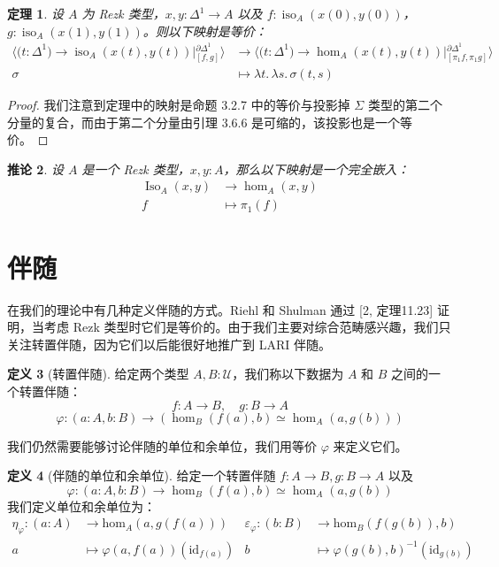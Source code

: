 \documentclass{ctexrep}
\theoremstyle{plain}
\newtheorem{theorem}{定理}[section]
\newtheorem{corollary}[theorem]{推论}
\theoremstyle{definition}
\newtheorem{definition}[theorem]{定义}
\theoremstyle{remark}
\theoremstyle{definition}
\theoremstyle{definition}
\theoremstyle{definition}
\newcommand{\UU}{\mathcal{U}}
\newcommand{\iso}{\operatorname{iso}}
\newcommand{\Iso}{\operatorname{Iso}}
\begin{document}
\begin{theorem}
设 $A$ 为 Rezk 类型，$x, y : \Delta^1 \to A$ 以及 $f : \iso_A(x(0), y(0))$，$g : \iso_A(x(1), y(1))$。则以下映射是等价：
\[
\begin{aligned}
\Big\langle \big(t : \Delta^1\big) \to \iso_A(x(t), y(t)) \mathrel{\Big|} {}_{[f,g]}^{\partial\Delta^1} \Big\rangle &\to \Big\langle \big(t : \Delta^1\big) \to \hom_A(x(t), y(t)) \mathrel{\Big|} {}_{[\pi_1 f, \pi_1 g]}^{\partial\Delta^1} \Big\rangle \\
\sigma &\mapsto \lambda t.\, \lambda s.\, \sigma(t,s)
\end{aligned}
\]
\end{theorem}

\begin{proof}
我们注意到定理中的映射是命题 3.2.7 中的等价与投影掉 $\Sigma$ 类型的第二个分量的复合，而由于第二个分量由引理 3.6.6 是可缩的，该投影也是一个等价。
\end{proof}

\begin{corollary}
设 $A$ 是一个 Rezk 类型，$x,y:A$，那么以下映射是一个完全嵌入：
\begin{align*}
\Iso_A(x,y) &\to \hom_A(x,y)\\
 f &\mapsto \pi_1(f)
\end{align*}
\end{corollary}

\section{伴随}

在我们的理论中有几种定义伴随的方式。Riehl 和 Shulman 通过 [2, 定理11.23] 证明，当考虑 Rezk 类型时它们是等价的。由于我们主要对综合范畴感兴趣，我们只关注转置伴随，因为它们以后能很好地推广到 LARI 伴随。

\begin{definition}[转置伴随]
给定两个类型 $A,B:\UU$，我们称以下数据为 $A$ 和 $B$ 之间的一个转置伴随：
\[
f:A\to B, \quad g:B\to A
\]
\[
\varphi : (a:A,b:B) \to (\hom_B(f(a),b) \simeq \hom_A(a,g(b)))
\]
\end{definition}

我们仍然需要能够讨论伴随的单位和余单位，我们用等价 $\varphi$ 来定义它们。

\begin{definition}[伴随的单位和余单位]
给定一个转置伴随 $f:A\to B, g:B\to A$ 以及
\[
\varphi : (a:A,b:B) \to \hom_B(f(a),b) \simeq \hom_A(a,g(b))
\]
我们定义单位和余单位为：
\begin{align*}
    \eta_{\varphi} : (a : A) &\to \text{hom}_A(a, g(f(a))) & \varepsilon_{\varphi} : (b : B) &\to \text{hom}_B(f(g(b)), b) \\
    a &\mapsto \varphi(a, f(a))(\text{id}_{f(a)}) & b &\mapsto \varphi(g(b), b)^{-1}(\text{id}_{g(b)})
\end{align*}
\end{definition}
\end{document}
